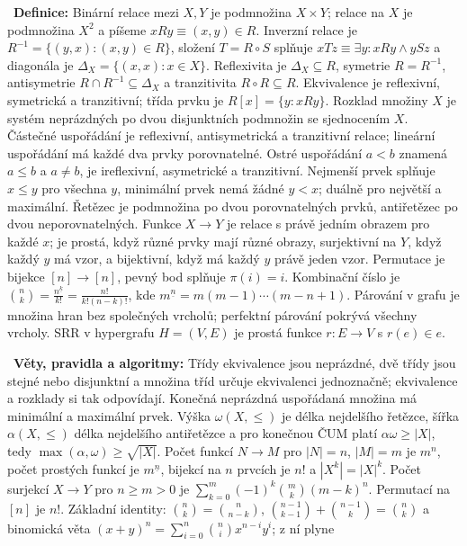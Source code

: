 \begin{odpoved}
\setlength{\parskip}{2pt}
\noindent{}\ \textbf{Definice:} Binární relace mezi $X,Y$ je podmnožina
$X\times Y$; relace na $X$ je podmnožina $X^2$ a píšeme $xRy\equiv(x,y)\in R$.
Inverzní relace je $R^{-1}=\{(y,x):(x,y)\in R\}$, složení $T=R\circ S$ splňuje
$xTz\equiv\exists y:xRy\land ySz$ a diagonála je $\Delta_X=\{(x,x):x\in X\}$.
Reflexivita je $\Delta_X\subseteq R$, symetrie $R=R^{-1}$, antisymetrie
$R\cap R^{-1}\subseteq\Delta_X$ a tranzitivita $R\circ R\subseteq R$. Ekvivalence je
reflexivní, symetrická a tranzitivní; třída prvku je $R[x]=\{y:xRy\}$. Rozklad množiny
$X$ je systém neprázdných po dvou disjunktních podmnožin se sjednocením $X$. Částečné
uspořádání je reflexivní, antisymetrická a tranzitivní relace; lineární uspořádání má
každé dva prvky porovnatelné. Ostré uspořádání $a<b$ znamená $a\le b$ a $a\ne b$,
je ireflexivní, asymetrické a tranzitivní. Nejmenší prvek splňuje $x\le y$ pro
všechna $y$, minimální prvek nemá žádné $y<x$; duálně pro největší a maximální.
Řetězec je podmnožina po dvou porovnatelných prvků, antiřetězec po dvou neporovnatelných.
Funkce $X\to Y$ je relace s právě jedním obrazem pro každé $x$; je prostá, když různé
prvky mají různé obrazy, surjektivní na $Y$, když každý $y$ má vzor, a bijektivní, když
má každý $y$ právě jeden vzor. Permutace je bijekce $[n]\to[n]$, pevný bod splňuje
$\pi(i)=i$. Kombinační číslo je
$\binom nk=\frac{n^{\underline k}}{k!}=\frac{n!}{k!(n-k)!}$, kde
$m^{\underline n}=m(m-1)\cdots(m-n+1)$. Párování v grafu je množina hran bez společných
vrcholů; perfektní párování pokrývá všechny vrcholy. SRR v hypergrafu $H=(V,E)$ je
prostá funkce $r:E\to V$ s $r(e)\in e$.\par
\noindent{}\ \textbf{Věty, pravidla a algoritmy:} Třídy ekvivalence jsou neprázdné,
dvě třídy jsou stejné nebo disjunktní a množina tříd určuje ekvivalenci jednoznačně;
ekvivalence a rozklady si tak odpovídají. Konečná neprázdná uspořádaná množina má
minimální a maximální prvek. Výška $\omega(X,\le)$ je délka nejdelšího řetězce, šířka
$\alpha(X,\le)$ délka nejdelšího antiřetězce a pro konečnou ČUM platí
$\alpha\omega\ge |X|$, tedy $\max(\alpha,\omega)\ge\sqrt{|X|}$. Počet funkcí
$N\to M$ pro $|N|=n$, $|M|=m$ je $m^n$, počet prostých funkcí je
$m^{\underline n}$, bijekcí na $n$ prvcích je $n!$ a $|X^k|=|X|^k$. Počet surjekcí
$X\to Y$ pro $n\ge m>0$ je
$\sum_{k=0}^m(-1)^k\binom mk(m-k)^n$. Permutací na $[n]$ je $n!$. Základní identity:
$\binom nk=\binom n{n-k}$,
$\binom{n-1}{k-1}+\binom{n-1}{k}=\binom nk$ a binomická věta
$(x+y)^n=\sum_{i=0}^n\binom ni x^{n-i}y^i$; z ní plyne

\end{odpoved}
